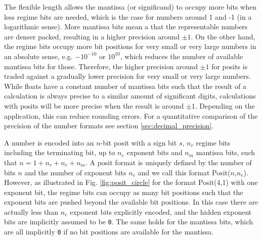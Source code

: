 The flexible length allows the mantissa (or significand) to occupy more bits when less regime bits are needed, which is the
case for numbers around 1 and -1 (in a logarithmic sense). More mantissa bits mean a that the representable numbers are
denser packed, resulting in a higher precision around $\pm 1$. On the other hand, the regime bits occupy more bit positions
for very small or very large numbers in an absolute sense, e.g. $-10^{-10}$ or $10^{10}$, which reduces the number of 
available mantissa bits for those. Therefore, the higher precision around $\pm 1$ for posits is traded against a gradually
lower precision for very small or very large numbers. While floats have a constant number of mantissa bits such that
the result of a calculation is always precise to a similar amount of significant digits, calculations with posits will be more precise
when the result is around $\pm 1$. Depending on the application, this can reduce rounding errors. For a quantitative comparison
of the precision of the number formats see section \ref{sec:decimal_precision}.

A number is encoded into an $n$-bit posit with a sign bit $s$, $n_r$ regime bits including the terminating bit, up to $n_e$ exponent bits
and $n_m$ mantissa bits, such that $n = 1 + n_r + n_e + n_m$. A posit format is uniquely defined by the number of bits $n$
and the number of exponent bits $n_e$ and we call this format Posit($n$,$n_e$). However, as illustrated in Fig. \ref{fig:posit_circle}
for the format Posit(4,1) with one exponent bit, the regime bits can occupy as many bit positions such that the exponent bits
are pushed beyond the available bit positions. In this case there are actually less than $n_e$ exponent bits explicitly encoded,
and the hidden exponent bits are implicitly assumed to be \texttt{0}. The same holds for the mantissa bits, which are all
implicitly \texttt{0} if no bit positions are available for the mantissa.

